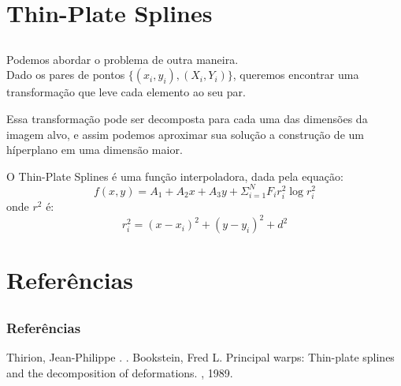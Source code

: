 \documentclass[t]{beamer}
\begin{document}
\section{Thin-Plate Splines}
\subsection{}

\begin{frame}
    Podemos abordar o problema de outra maneira. \\
    Dado os pares de pontos $\{(x_i,y_i),(X_i,Y_i)\}$, queremos encontrar uma transformação que leve cada elemento
    ao seu par.
\end{frame}

\begin{frame}
    Essa transformação pode ser decomposta para cada uma das dimensões da imagem alvo, e assim podemos
    aproximar sua solução a construção de um híperplano em uma dimensão maior.
\end{frame}

\begin{frame}
    O Thin-Plate Splines é uma função interpoladora, dada pela equação:
    \begin{equation*}
        f(x,y) = A_1 + A_2x + A_3y + \Sigma_{i=1}^{N} F_ir_i^2 \log{r_i^2}
    \end{equation*}
    onde $r^2$ é:
    \begin{equation*}
        r^2_i = (x-x_i)^2+(y-y_i)^2+d^2
    \end{equation*}
\end{frame}

\section{Referências}
\subsection{}

\begin{frame}[allowframebreaks]
  \frametitle<presentation>{Referências}    
  \begin{thebibliography}{10}    
    Thirion, Jean-Philippe
    .
    .
    Bookstein, Fred L.
    \newblock Principal warps: Thin-plate splines and the decomposition of deformations.
    , 1989.
  \end{thebibliography}
\end{frame}
\end{document}
